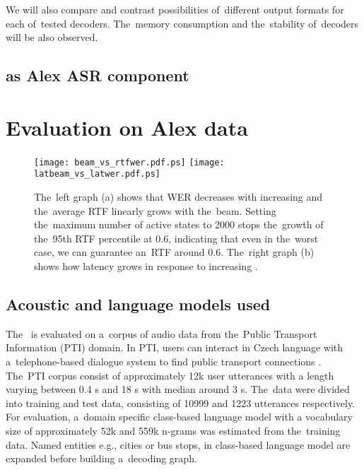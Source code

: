 We will also compare and contrast possibilities of~different output formats for each of~tested decoders. The~memory consumption and the~stability of~decoders will be also observed. 


\subsection{ as Alex ASR component}
\label{sub:asr_component}







\section{Evaluation on Alex data}
\label{sec:eval}

\begin{figure*}[t]
    \begin{center}
    \texttt{[image: beam\_vs\_rtfwer.pdf.ps]}
    \texttt{[image: latbeam\_vs\_latwer.pdf.ps]}
    \caption{The~left graph (a) shows that WER decreases with increasing  and the~average RTF linearly grows with the~beam.
    Setting the~maximum number of active states to 2000 stops the~growth of the~95th RTF percentile at 0.6, indicating that even in the~worst case, we can guarantee an~RTF around 0.6.
    The~right graph (b) shows how latency grows in response to increasing .}
    \label{fig:wer} 
    \end{center}
\end{figure*}

\subsection{Acoustic and language models used}
\label{sec:train}

The~ is evaluated on a~corpus of audio data from the~Public Transport Information (PTI) domain.
In PTI, users can interact in Czech language with a~telephone-based dialogue system to find public transport connections \cite{ptics2014url}.
The~PTI corpus consist of approximately 12k user utterances with a length varying between 0.4 s and 18 s with median around 3 s.
The~data were divided into training and test data, consisting of 10999 and 1223 utterances respectively.
For evaluation, a~domain specific class-based language model with a vocabulary size of approximately 52k  and 559k n-grams was estimated from the~training data.
Named entities e.g., cities or bus stops, in class-based language model are expanded before building a~decoding graph.

